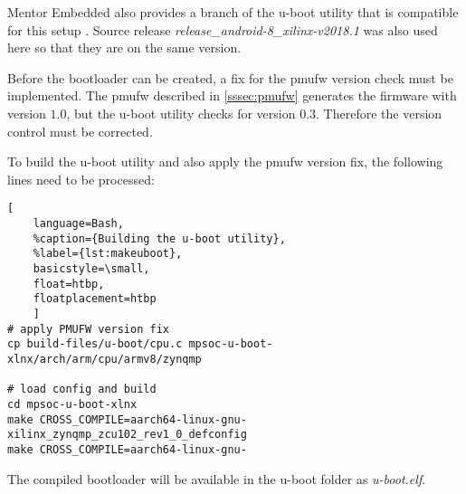 Mentor Embedded also provides a branch of the u-boot utility that is compatible for this setup \cite{uboot}. Source release \emph{release_android-8_xilinx-v2018.1} was also used here so that they are on the same version.

Before the bootloader can be created, a fix for the \gls{pmufw} version check must be implemented. The \gls{pmufw} described in \cref{sssec:pmufw} generates the firmware with version $1.0$, but the u-boot utility checks for version $0.3$. Therefore the version control must be corrected.

To build the u-boot utility and also apply the \gls{pmufw} version fix, the following lines need to be processed:
\begin{lstlisting}[
	language=Bash,
	%caption={Building the u-boot utility},
	%label={lst:makeuboot},
	basicstyle=\small,
	float=htbp,
	floatplacement=htbp
	]
# apply PMUFW version fix
cp build-files/u-boot/cpu.c mpsoc-u-boot-xlnx/arch/arm/cpu/armv8/zynqmp

# load config and build
cd mpsoc-u-boot-xlnx
make CROSS_COMPILE=aarch64-linux-gnu- xilinx_zynqmp_zcu102_rev1_0_defconfig
make CROSS_COMPILE=aarch64-linux-gnu-
\end{lstlisting}
\FloatBarrier

The compiled bootloader will be available in the u-boot folder as \emph{u-boot.elf}.